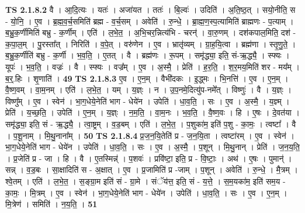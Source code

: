 \documentclass[17pt]{extarticle}
\begin{document}
                  \newline
                                \textbf{ TS 2.1.8.2} \newline
                  वै । आ॒दि॒त्यः । यतः॑ । अजा॑यत । ततः॑ । बि॒ल्वः॑ । उदिति॑ । अ॒ति॒ष्ठ॒त् । सयो॒नीति॒ स - यो॒नि॒ । ए॒व । ब्र॒ह्म॒व॒र्च॒समिति॑ ब्रह्म - व॒र्च॒सम् । अवेति॑ । रु॒न्धे॒ । ब्रा॒ह्म॒ण॒स्प॒त्यामिति॑ ब्राह्मणः - प॒त्याम् । ब॒भ्रु॒क॒र्णीमिति॑ बभ्रु - क॒र्णीम् । एति॑ । ल॒भे॒त॒ । अ॒भि॒चर॒न्नित्य॑भि - चरन्॑ । वा॒रु॒णम् । दश॑कपाल॒मिति॒ दश॑ - क॒पा॒ल॒म् । पु॒रस्ता᳚त् । निरिति॑ । व॒पे॒त् । वरु॑णेन । ए॒व । भ्रातृ॑व्यम् । ग्रा॒ह॒यि॒त्वा । ब्रह्म॑णा । स्तृ॒णु॒ते॒ । ब॒भ्रु॒क॒र्णीति॑ बभ्रु - क॒र्णी । भ॒व॒ति॒ । ए॒तत् । वै । ब्रह्म॑णः । रू॒पम् । समृ॑द्ध्या॒ इति॒ सं-ऋ॒द्ध्यै॒ । स्फ्यः । यूपः॑ । भ॒व॒ति॒ । वज्रः॑ । वै । स्फ्यः । वज्र᳚म् । ए॒व । अ॒स्मै॒ । प्रेति॑ । ह॒र॒ति॒ । श॒र॒मय॒मिति॑ शर - मय᳚म् । ब॒र्॒.हिः । शृ॒णाति॑ । \textbf{  49} \newline
                  \newline
                                \textbf{ TS 2.1.8.3} \newline
                  ए॒व । ए॒न॒म् । वैभी॑दकः । इ॒द्ध्मः । भि॒नत्ति॑ । ए॒व । ए॒न॒म् । वै॒ष्ण॒वम् । वा॒म॒नम् । एति॑ । ल॒भे॒त॒ । यम् । य॒ज्ञ्ः । न । उ॒प॒नमे॒दित्यु॑प-नमे᳚त् । विष्णुः॑ । वै । य॒ज्ञ्ः । विष्णु᳚म् । ए॒व । स्वेन॑ । भा॒ग॒धेये॒नेति॑ भाग - धेये॑न । उपेति॑ । धा॒व॒ति॒ । सः । ए॒व । अ॒स्मै॒ । य॒ज्ञ्म् । प्रेति॑ । य॒च्छ॒ति॒ । उपेति॑ । ए॒न॒म् । य॒ज्ञ्ः । न॒म॒ति॒ । वा॒म॒नः । भ॒व॒ति॒ । वै॒ष्ण॒वः । हि । ए॒षः । दे॒वत॑या । समृ॑द्ध्या॒ इति॒ सं - ऋ॒द्ध्यै॒ । त्वा॒ष्ट्रम् । व॒ड॒बम् । एति॑ । ल॒भे॒त॒ । प॒शुका॑म॒ इति॑ प॒शु - का॒मः॒ । त्वष्टा᳚ । वै । प॒शू॒नाम् । मि॒थु॒नाना᳚म् । \textbf{  50} \newline
                  \newline
                                \textbf{ TS 2.1.8.4} \newline
                  प्र॒ज॒न॒यि॒तेति॑ प्र - ज॒न॒यि॒ता । त्वष्टा॑रम् । ए॒व । स्वेन॑ । भा॒ग॒धेये॒नेति॑ भाग - धेये॑न । उपेति॑ । धा॒व॒ति॒ । सः । ए॒व । अ॒स्मै॒ । प॒शून् । मि॒थु॒नान् । प्रेति॑ । ज॒न॒य॒ति॒ । प्र॒जेति॑ प्र - जा । हि । वै । ए॒तस्मिन्न्॑ । प॒शवः॑ । प्रवि॑ष्टा॒ इति॒ प्र - वि॒ष्टाः॒ । अथ॑ । ए॒षः । पुमान्॑ । सन्न् । व॒ड॒बः । सा॒क्षादिति॑ स - अ॒क्षात् । ए॒व । प्र॒जामिति॑ प्र -जाम् । प॒शून् । अवेति॑ । रु॒न्धे॒ । मै॒त्रम् । श्वे॒तम् । एति॑ । ल॒भे॒त॒ । स॒ङ्ग्रा॒म इति॑ सं - ग्रा॒मे । संॅय॑त्त॒ इति॒ सं - य॒त्ते॒ । स॒म॒यका॑म॒ इति॑ सम॒य - का॒मः॒ । मि॒त्रम् । ए॒व । स्वेन॑ । भा॒ग॒धेये॒नेति॑ भाग - धेये॑न । उपेति॑ । धा॒व॒ति॒ । सः । ए॒व । ए॒न॒म् । मि॒त्रेण॑ । समिति॑ । न॒य॒ति॒ । \textbf{  51} \newline
\end{document}
